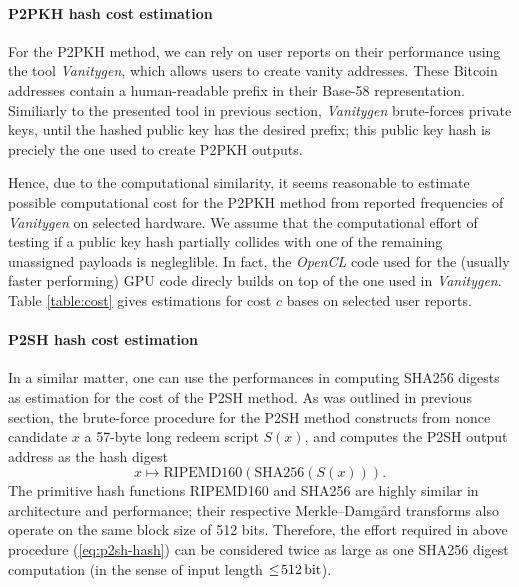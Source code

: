 \documentclass[10pt,a4paper,twocolumn]{article}
\begin{document}
\paragraph{P2PKH hash cost estimation}
For the {P2PKH} method, we can rely on user reports on their performance using the tool \emph{Vanitygen}, which allows users to create vanity addresses.
These Bitcoin addresses contain a human-readable prefix in their Base-58 representation.
Similiarly to the presented tool in previous section, \emph{Vanitygen} brute-forces private keys, until the hashed public key has the desired prefix;
this public key hash is preciely the one used to create {P2PKH} outputs.

Hence, due to the computational similarity, it seems reasonable to estimate possible computational cost for the {P2PKH} method from reported frequencies of \emph{Vanitygen} on selected hardware.
We assume that the computational effort of testing if a public key hash partially collides with one of the remaining unassigned payloads is negleglible.
In fact, the \emph{OpenCL} code used for the (usually faster performing) GPU code direcly builds on top of the one used in \emph{Vanitygen}.
Table \ref{table:cost} gives estimations for cost $c$ bases on selected user reports.

\paragraph{P2SH hash cost estimation}
In a similar matter, one can use the performances in computing {SHA256} digests as estimation for the cost of the {P2SH} method.
%
%
As was outlined in previous section, the brute-force procedure for the {P2SH} method constructs from nonce candidate $x$ a 57-byte long redeem script $S(x)$, and computes the {P2SH} output address as the hash digest 
\begin{equation}
    x \mapsto \text{{RIPEMD160}}(\text{{SHA256}}(S(x))).\label{eq:p2sh-hash}
\end{equation}
The primitive hash functions {RIPEMD160} and {SHA256} are highly similar in architecture and performance; their respective Merkle–Damgård transforms also operate on the same block size of 512 bits.
Therefore, the effort required in above procedure (\ref{eq:p2sh-hash}) can be considered twice as large as one {SHA256} digest computation (in the sense of input length $\leq\!\SI{512}{\bit}$). 
\end{document}
